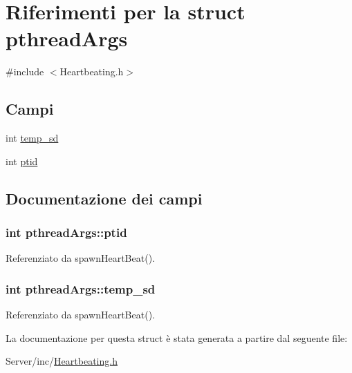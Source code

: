 \hypertarget{structpthreadArgs}{}\section{Riferimenti per la struct pthread\+Args}
\label{structpthreadArgs}


{\ttfamily \#include $<$Heartbeating.\+h$>$}

\subsection*{Campi}
\begin{DoxyCompactItemize}
\item 
int \hyperlink{structpthreadArgs_a028f49dcb3a6ed77870caacec6f2b968}{temp\+\_\+sd}
\item 
int \hyperlink{structpthreadArgs_abc763a99a614f8e00c11fbbece336516}{ptid}
\end{DoxyCompactItemize}


\subsection{Documentazione dei campi}
\hypertarget{structpthreadArgs_abc763a99a614f8e00c11fbbece336516}{}
\subsubsection[{ptid}]{\setlength{\rightskip}{0pt plus 5cm}int pthread\+Args\+::ptid}\label{structpthreadArgs_abc763a99a614f8e00c11fbbece336516}


Referenziato da spawn\+Heart\+Beat().

\hypertarget{structpthreadArgs_a028f49dcb3a6ed77870caacec6f2b968}{}
\subsubsection[{temp\+\_\+sd}]{\setlength{\rightskip}{0pt plus 5cm}int pthread\+Args\+::temp\+\_\+sd}\label{structpthreadArgs_a028f49dcb3a6ed77870caacec6f2b968}


Referenziato da spawn\+Heart\+Beat().



La documentazione per questa struct è stata generata a partire dal seguente file\+:\begin{DoxyCompactItemize}
\item 
Server/inc/\hyperlink{Heartbeating_8h}{Heartbeating.\+h}\end{DoxyCompactItemize}
